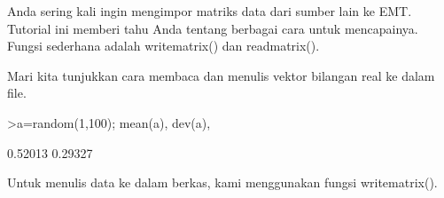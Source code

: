 \documentclass[a4paper,10pt]{article}
\begin{document}
\begin{eulernotebook}
\begin{eulercomment}
\begin{eulercomment}
\begin{eulercomment}
\begin{eulercomment}
\begin{eulercomment}
\begin{eulercomment}
\begin{eulercomment}
\begin{eulercomment}
\begin{eulercomment}
\begin{eulercomment}
\begin{eulercomment}
\begin{eulercomment}
\begin{eulercomment}
\begin{eulercomment}
\begin{eulercomment}
\begin{eulercomment}
\begin{eulercomment}
\begin{eulercomment}
\begin{eulercomment}
\begin{eulercomment}
\begin{eulercomment}
\begin{eulercomment}
\begin{eulercomment}
\begin{eulercomment}
\begin{eulercomment}
\begin{eulercomment}
\begin{eulercomment}
\begin{eulercomment}
\begin{eulercomment}
\begin{eulercomment}
\begin{eulercomment}
\begin{eulercomment}
\begin{eulercomment}
\begin{eulercomment}
\begin{eulercomment}
\begin{eulercomment}
\begin{eulercomment}
Anda sering kali ingin mengimpor matriks data dari sumber lain ke EMT.
Tutorial ini memberi tahu Anda tentang berbagai cara untuk
mencapainya. Fungsi sederhana adalah writematrix() dan readmatrix().

Mari kita tunjukkan cara membaca dan menulis vektor bilangan real ke
dalam file.
\end{eulercomment}
\begin{eulerprompt}
>a=random(1,100); mean(a), dev(a),
\end{eulerprompt}
\begin{euleroutput}
  0.52013
  0.29327
\end{euleroutput}
\begin{eulercomment}
Untuk menulis data ke dalam berkas, kami menggunakan fungsi
writematrix().


\end{eulercomment}
\end{eulercomment}
\end{eulercomment}
\end{eulercomment}
\end{eulercomment}
\end{eulercomment}
\end{eulercomment}
\end{eulercomment}
\end{eulercomment}
\end{eulercomment}
\end{eulercomment}
\end{eulercomment}
\end{eulercomment}
\end{eulercomment}
\end{eulercomment}
\end{eulercomment}
\end{eulercomment}
\end{eulercomment}
\end{eulercomment}
\end{eulercomment}
\end{eulercomment}
\end{eulercomment}
\end{eulercomment}
\end{eulercomment}
\end{eulercomment}
\end{eulercomment}
\end{eulercomment}
\end{eulercomment}
\end{eulercomment}
\end{eulercomment}
\end{eulercomment}
\end{eulercomment}
\end{eulercomment}
\end{eulercomment}
\end{eulercomment}
\end{eulercomment}
\end{eulercomment}
\end{eulernotebook}
\end{document}
